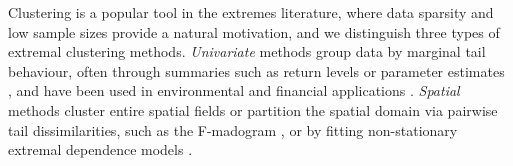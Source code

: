 \documentclass[12pt,compact]{article}
\begin{document}
Clustering is a popular tool in the extremes literature, where data sparsity and low sample sizes provide a natural motivation, and we distinguish three types of extremal clustering methods. %
\emph{Univariate} methods group data by marginal tail behaviour, often through summaries such as return levels or parameter estimates \citep{Coles2001}, and have been used in environmental and financial applications \citep{Alonso2014-rr, deCarvalho2023, Zheng2023-jf}.
\emph{Spatial} methods cluster entire spatial fields or partition the spatial domain via pairwise tail dissimilarities, such as the F-madogram \citep{Cooley2006variograms, Bernard2013}, or by fitting non-stationary extremal dependence models \citep{Carreau2017, Rohrbeck2021, Dupuis2023, Shao2025}. 
\end{document}
